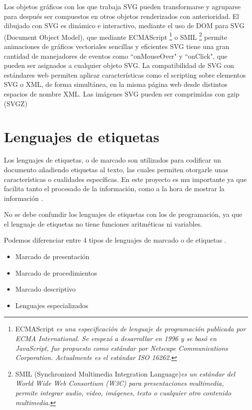 Los objetos gráficos con los que trabaja SVG pueden transformarse y agruparse para después ser compuestos en otros objetos renderizados con anterioridad. 
El dibujado con SVG es dinámico e interactivo, mediante el uso de DOM para SVG (Document Object Model), que mediante ECMAScript \footnote{ECMAScript \textit{es una especificación de lenguaje de programación publicada por ECMA International. Se empezó a desarrollar en 1996 y se basó en JavaScript, fue propuesto como estándar por Netscape Communications Corporation. Actualmente es el estándar ISO 16262.}} o SMIL \footnote{SMIL (Synchronized Multimedia Integration Language)\textit{es un estándar del World Wide Web Consortium (W3C) para presentaciones multimedia, permite integrar audio, video, imágenes, texto o cualquier otro contenido multimedia.}} permite animaciones de gráficos vectoriales sencillas y eficientes
SVG tiene una gran cantidad de manejadores de eventos como ``onMouseOver" y ``onClick", que pueden ser asignados a cualquier objeto SVG. La compatibilidad de SVG con estándares web permiten aplicar características como el scripting sobre elementos SVG o XML, de forma simultánea, en la misma página web desde distintos espacios de nombre XML.
Las imágenes SVG pueden ser comprimidas con gzip (SVGZ)


\section{Lenguajes de etiquetas}\label{lenguajes-etiuetas}
\newcommand\tab[1][1cm]{\hspace*{#1}}

Los lenguajes de etiquetas, o de marcado son utilizados para codificar un documento añadiendo etiquetas al texto, las cuales permiten otorgarle unas características o cualidades específicas. En este proyecto es mu importante ya que facilita tanto el procesado de la información, como a la hora de mostrar la información \cite{noauthor_lenguaje_2017:a}.

No se debe confundir los lenguajes de etiquetas con los de programación, ya que el lenguaje de etiquetas no tiene funciones aritméticas ni variables.

Podemos diferenciar entre 4 tipos de lenguajes de marcado \cite{noauthor_1.1_nodate:a} o de etiquetas \cite{noauthor_lenguaje_nodate:a}.
\begin{itemize}
\item
Marcado de presentación
\item
Marcado de procedimientos
\item
Marcado descriptivo
\item
Lenguajes especializados

\end{itemize}

